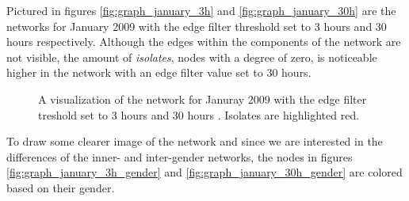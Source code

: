 Pictured in figures \ref{fig:graph_january_3h} and  \ref{fig:graph_january_30h} are the networks for January 2009 with the edge filter threshold set to 3 hours and 30 hours respectively. Although the edges within the components of the network are not visible, the amount of \textit{isolates}, nodes with a degree of zero, is noticeable higher in the network with an edge filter value set to 30 hours.

\begin{figure}[htpb]%
	\centering 
	\qquad 
	\caption[Network visualizations with different edge filter values]{A visualization of the network for Januray 2009 with the edge filter treshold set to 3 hours  and 30 hours . Isolates are highlighted red.} 
	 
\end{figure}    

To draw some clearer image of the network and since we are interested in the differences of the inner- and inter-gender networks, the nodes in figures \ref{fig:graph_january_3h_gender} and \ref{fig:graph_january_30h_gender} are colored based on their gender.

